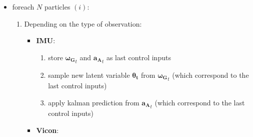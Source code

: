 \documentclass[12pt,]{article}
\providecommand{\tightlist}{%
  \setlength{\itemsep}{0pt}\setlength{\parskip}{0pt}}
\begin{document}
\begin{itemize}
\tightlist
\item
  foreach \(N\) particles \((i)\):

  \begin{enumerate}
  \def\labelenumi{\arabic{enumi}.}
  \tightlist
  \item
    Depending on the type of observation:

    \begin{itemize}
    \tightlist
    \item
      \textbf{IMU}:

      \begin{enumerate}
      \def\labelenumii{\arabic{enumii}.}
      \tightlist
      \item
        store \(\boldsymbol{\mathbf{\omega_G}}_t\) and
        \(\mathbf{a_A}_t\) as last control inputs
      \item
        sample new latent variable \(\boldsymbol{\theta_t}\) from
        \(\boldsymbol{\mathbf{\omega_G}}_t\) (which correspond to the
        last control inputs)
      \item
        apply kalman prediction from \(\mathbf{a_A}_t\) (which
        correspond to the last control inputs)
      \end{enumerate}
    \item
      \textbf{Vicon}:


\end{itemize}
\end{enumerate}
\end{itemize}
\end{document}
